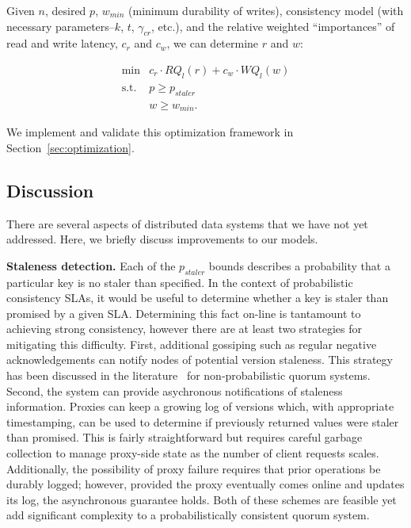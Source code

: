 \documentclass{vldb}
\begin{document}
Given $n$, desired $p$, $w_{min}$ (minimum durability of writes),
consistency model (with necessary parameters--$k$, $t$, $\gamma_{cr}$,
etc.), and the relative weighted ``importances'' of read
and write latency, $c_r$ and $c_w$, we can determine $r$ and $w$:

\begin{equation}
 \begin{array}{rl}
    \min        & c_r\cdot RQ_l(r) +c_w \cdot WQ_l(w) \\
    \mbox{s.t.} & p \ge p_{staler} \\
                & w \ge w_{min}.
    \end{array}
\end{equation}

We implement and validate this optimization framework in
Section~\ref{sec:optimization}.

\subsection{Discussion}
\label{sec:discussion}

There are several aspects of distributed data systems that we have not yet
addressed.  Here, we briefly discuss improvements to our models.

\textbf{Staleness detection.} Each of the $p_{staler}$ bounds
describes a probability that a particular key is no staler than
specified.  In the context of probabilistic consistency SLAs, it would
be useful to determine whether a key is staler than promised by a
given SLA.  Determining this fact on-line is tantamount to achieving
strong consistency, however there are at least two strategies for
mitigating this difficulty. First, additional gossiping such as
regular negative acknowledgements can notify nodes of potential
version staleness.  This strategy has been discussed in the
literature~\cite{tocite} for non-probabilistic quorum systems.
Second, the system can provide asychronous notifications of staleness
information.  Proxies can keep a growing log of versions which, with
appropriate timestamping, can be used to determine if previously
returned values were staler than promised.  This is fairly
straightforward but requires careful garbage collection to manage
proxy-side state as the number of client requests scales.
Additionally, the possibility of proxy failure requires that prior
operations be durably logged; however, provided the proxy eventually
comes online and updates its log, the asynchronous guarantee holds.
Both of these schemes are feasible yet add significant complexity to a
probabilistically consistent quorum system.
\end{document}
